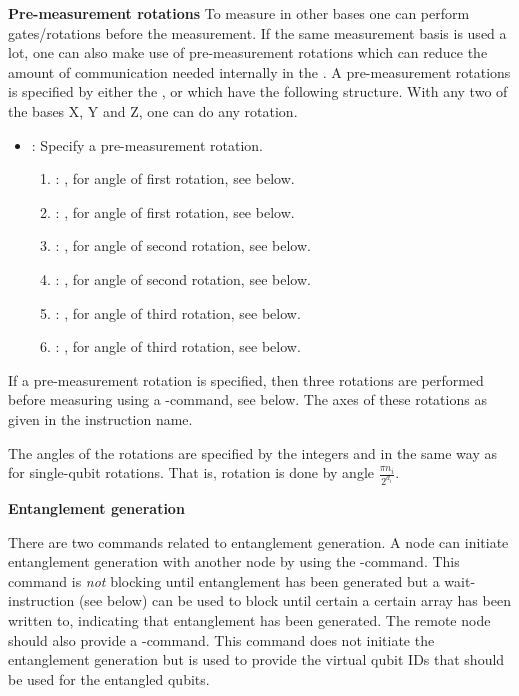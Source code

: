 \textbf{Pre-measurement rotations}
To measure in other bases one can perform gates/rotations before the measurement.
If the same measurement basis is used a lot, one can also make use of pre-measurement rotations which can reduce the amount of communication needed internally in the \QNPU.
A pre-measurement rotations is specified by either the ,  or  which have the following structure.
With any two of the bases X, Y and Z, one can do any rotation.
\begin{itemize}
  \item {}: Specify a pre-measurement rotation.
        \begin{enumerate}
          \item \IMMEDIATE: , for angle of first rotation, see below.
          \item \IMMEDIATE: , for angle of first rotation, see below.
          \item \IMMEDIATE: , for angle of second rotation, see below.
          \item \IMMEDIATE: , for angle of second rotation, see below.
          \item \IMMEDIATE: , for angle of third rotation, see below.
          \item \IMMEDIATE: , for angle of third rotation, see below.
        \end{enumerate}
\end{itemize}
If a pre-measurement rotation is specified, then three rotations are performed before measuring using a -command, see below.
The axes of these rotations as given in the instruction name.

The angles of the rotations are specified by the integers  and  in the same way as for single-qubit rotations.
That is, rotation  is done by angle $\frac{\pi n_i}{2^{d_i}}$.

\textbf{Entanglement generation}

There are two commands related to entanglement generation.
A node can initiate entanglement generation with another node by using the -command.
This command is \emph{not} blocking until entanglement has been generated but a wait-instruction (see below) can be used to block until certain a certain array has been written to, indicating that entanglement has been generated.
The remote node should also provide a -command.
This command does not initiate the entanglement generation but is used to provide the virtual qubit IDs that should be used for the entangled qubits.

